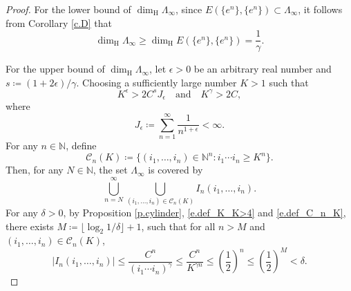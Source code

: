 \documentclass[12pt,reqno]{amsart}
\renewcommand{\=}{\coloneqq}
\theoremstyle{plain}
\begin{document}
\begin{proof}
For the lower bound of $\dim_{\mathrm{H}}\Lambda_{\infty}$, since $E(\{e^n\},\{e^n\})\subset \Lambda_{\infty}$, it follows from Corollary \ref{c.D} that
        \begin{equation*}
        \dim_{\mathrm{H}}\Lambda_{\infty}\geq
        \dim_{\mathrm{H}}
        E(\{e^n\},\{e^n\})
        =\frac{1}{\gamma}.
        \end{equation*}

 For the upper bound of $\dim_{\mathrm{H}}\Lambda_{\infty}$, let $\epsilon >0$ be an arbitrary real number and $s\coloneqq (1+2\epsilon)/\gamma$.
Choosing a sufficiently large number $K>1$ such that
        \begin{equation}\label{e.def_K_K>4}
                K^{\epsilon}>2C^sJ_{\epsilon}
                \quad \mathrm{and}\quad
                K^{\gamma}>2C,
        \end{equation}
         where
        \begin{equation}\label{e.def_J_epsilon}
             J_{\epsilon} \coloneqq \sum_{n=1}^{\infty}
        \frac{1}{n^{1+\epsilon}}<\infty.
        \end{equation}
For any $n \in \mathbb N$, define
 \begin{equation}\label{e.def_C_n_K}
             \mathcal{C}_n(K)
        \coloneqq\{
                (i_1,\dots,i_{n})\in
                \mathbb{N}^n:
                i_1\cdots i_{n}\geq K^n
        \}.
        \end{equation}
Then, for any $N\in\mathbb{N}$, the set $\Lambda_{\infty}$ is covered by
 \begin{equation}\label{e.cover_Pi_infty}
                \bigcup_{n=N}^{\infty}
                \bigcup_{(i_1,\dots,i_{n})\in \mathcal{C}_n(K)}
                I_n(i_1,\dots,i_{n}).
        \end{equation}
For any $\delta >0$, by Proposition \ref{p.cylinder},  \eqref{e.def_K_K>4} and \eqref{e.def_C_n_K}, there exists $M \coloneqq \lfloor \log _{2} 1/\delta\rfloor +1$,
        such that for all $n>M$ and $(i_1,\dots,i_{n})\in \mathcal{C}_n(K)$,
        \begin{equation*}\label{e.delta_cover_condition}
             |I_n(i_1,\dots, i_{n})|
            \leq \frac{C^{n}}
            {(i_1\cdots i_{n})^{\gamma}}
            \leq \frac{C^{n}}{K^{\gamma n}}
            \leq \left(\frac{1}{2}\right)^n
            \leq \left(\frac{1}{2}\right)^M
            <\delta.
        \end{equation*}

\end{proof}
\end{document}
